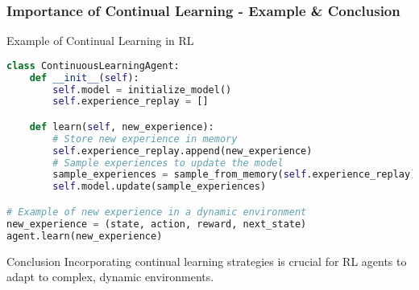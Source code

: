 \documentclass[aspectratio=169]{beamer}
\begin{document}
\begin{frame}[fragile]
    \frametitle{Importance of Continual Learning - Example & Conclusion}
    \begin{block}{Example of Continual Learning in RL}
        \begin{lstlisting}[language=Python]
class ContinuousLearningAgent:
    def __init__(self):
        self.model = initialize_model()
        self.experience_replay = []

    def learn(self, new_experience):
        # Store new experience in memory
        self.experience_replay.append(new_experience)
        # Sample experiences to update the model
        sample_experiences = sample_from_memory(self.experience_replay)
        self.model.update(sample_experiences)

# Example of new experience in a dynamic environment
new_experience = (state, action, reward, next_state)
agent.learn(new_experience)
        \end{lstlisting}
    \end{block}

    \begin{block}{Conclusion}
        Incorporating continual learning strategies is crucial for RL agents to adapt to complex, dynamic environments.
    \end{block}
\end{frame}
\end{document}
